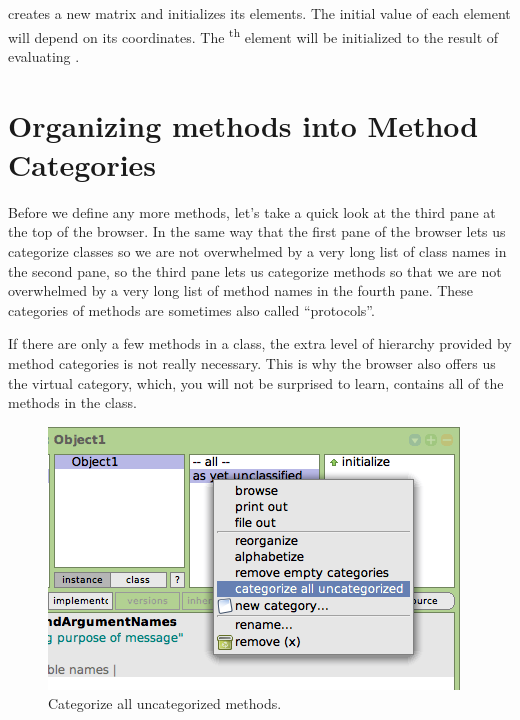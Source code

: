 \documentclass[a4paper,10pt,twoside]{book}
\begin{document}
 creates a new  matrix and initializes its elements.  The initial value of each element will depend on its coordinates.  The \textsuperscript{th} element will be initialized to the result of evaluating .

\section{Organizing methods into Method Categories}

Before we define any more methods, let's take a quick look at the third pane at the top of the browser.
In the same way that the first pane of the browser lets us categorize classes so we are not overwhelmed by a very long list of class names in the second pane, so the third pane lets us categorize methods so that we are not overwhelmed by a very long list of method names in the fourth pane.   
These categories of methods are sometimes also called ``protocols''.

If there are only a few methods in a class, the extra level of hierarchy provided by method categories is not really necessary.
This is why the browser also offers us the  virtual category, which, you will not be surprised to learn, contains all of the methods in the class.

\begin{figure}[htbp]
   \centering
   \includegraphics[scale=0.65]{Categorize} 
   \caption{Categorize all uncategorized methods.\label{fig:categorize}}
\end{figure}
\end{document}
